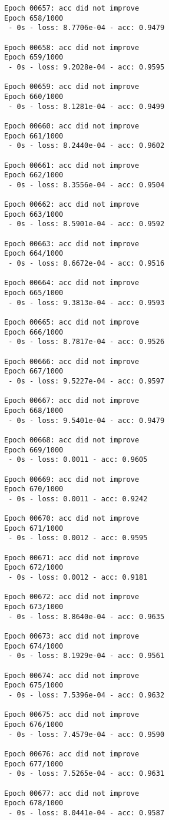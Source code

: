 \documentclass[11pt]{article}
\begin{document}
\begin{Verbatim}[commandchars=\\\{\}]
Epoch 00657: acc did not improve
Epoch 658/1000
 - 0s - loss: 8.7706e-04 - acc: 0.9479

Epoch 00658: acc did not improve
Epoch 659/1000
 - 0s - loss: 9.2028e-04 - acc: 0.9595

Epoch 00659: acc did not improve
Epoch 660/1000
 - 0s - loss: 8.1281e-04 - acc: 0.9499

Epoch 00660: acc did not improve
Epoch 661/1000
 - 0s - loss: 8.2440e-04 - acc: 0.9602

Epoch 00661: acc did not improve
Epoch 662/1000
 - 0s - loss: 8.3556e-04 - acc: 0.9504

Epoch 00662: acc did not improve
Epoch 663/1000
 - 0s - loss: 8.5901e-04 - acc: 0.9592

Epoch 00663: acc did not improve
Epoch 664/1000
 - 0s - loss: 8.6672e-04 - acc: 0.9516

Epoch 00664: acc did not improve
Epoch 665/1000
 - 0s - loss: 9.3813e-04 - acc: 0.9593

Epoch 00665: acc did not improve
Epoch 666/1000
 - 0s - loss: 8.7817e-04 - acc: 0.9526

Epoch 00666: acc did not improve
Epoch 667/1000
 - 0s - loss: 9.5227e-04 - acc: 0.9597

Epoch 00667: acc did not improve
Epoch 668/1000
 - 0s - loss: 9.5401e-04 - acc: 0.9479

Epoch 00668: acc did not improve
Epoch 669/1000
 - 0s - loss: 0.0011 - acc: 0.9605

Epoch 00669: acc did not improve
Epoch 670/1000
 - 0s - loss: 0.0011 - acc: 0.9242

Epoch 00670: acc did not improve
Epoch 671/1000
 - 0s - loss: 0.0012 - acc: 0.9595

Epoch 00671: acc did not improve
Epoch 672/1000
 - 0s - loss: 0.0012 - acc: 0.9181

Epoch 00672: acc did not improve
Epoch 673/1000
 - 0s - loss: 8.8640e-04 - acc: 0.9635

Epoch 00673: acc did not improve
Epoch 674/1000
 - 0s - loss: 8.1929e-04 - acc: 0.9561

Epoch 00674: acc did not improve
Epoch 675/1000
 - 0s - loss: 7.5396e-04 - acc: 0.9632

Epoch 00675: acc did not improve
Epoch 676/1000
 - 0s - loss: 7.4579e-04 - acc: 0.9590

Epoch 00676: acc did not improve
Epoch 677/1000
 - 0s - loss: 7.5265e-04 - acc: 0.9631

Epoch 00677: acc did not improve
Epoch 678/1000
 - 0s - loss: 8.0441e-04 - acc: 0.9587


\end{Verbatim}
\end{document}
